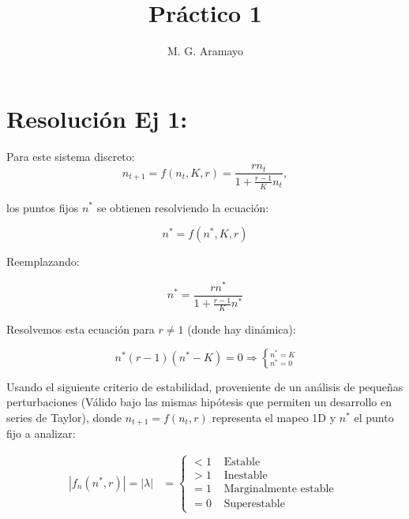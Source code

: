 \documentclass[twocolumn,aps,prl]{revtex4-1}
\newcommand{\nstar}{n^*}
\begin{document}

\title{Práctico 1}
\author{M. G. Aramayo}


\maketitle



\section{Resolución Ej 1:}

Para este sistema discreto: 
$$n_{t+1} = f(n_t, K, r)= \frac{r n_t}{1+\frac{r-1}{K} n_t},$$ 

los puntos fijos $n^*$ se obtienen resolviendo la ecuación:

$$
n^* = f(n^*, K, r)
$$

Reemplazando:

$$
\nstar = \frac{r \nstar}{1+\frac{r-1}{K} \nstar}
$$


Resolvemos esta ecuación para $r\neq 1$ (donde hay dinámica):

$$
\nstar (r-1) (\nstar-K) = 0 \Rightarrow \left\lbrace ^{\nstar = K} _{\nstar = 0}  \right .
$$

Usando el siguiente criterio de estabilidad, proveniente de un análisis de pequeñas perturbaciones (Válido bajo las mismas hipótesis que permiten un desarrollo en series de Taylor), donde $n_{t+1} = f(n_t,r)$ representa el mapeo 1D y $\nstar$ el punto fijo a analizar:

$$
\begin{aligned}
|f_{n}\left(n^{*},r\right)| = |\lambda| &=\left\{\begin{array}{ll}
<1 & \text { Estable } \\
>1 & \text { Inestable } \\
=1 & \text { Marginalmente estable } \\
=0 & \text { Superestable }
\end{array}\right.
\end{aligned}
$$
\end{document}
